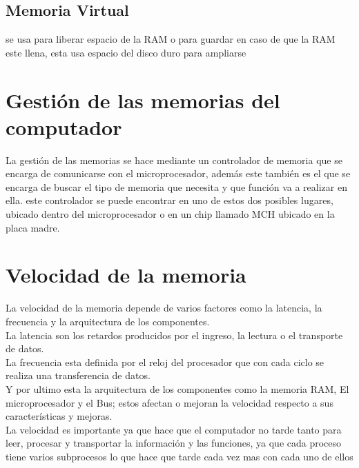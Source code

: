 \documentclass{article}
\begin{document}
	\subsection{Memoria Virtual}
	se usa para liberar espacio de la RAM o para guardar en caso de que la RAM este llena, esta usa espacio del disco duro para ampliarse
	
	\section{Gestión de las memorias del computador}
	La gestión de las memorias se hace mediante un controlador de memoria que se encarga de comunicarse con el microprocesador, además este también es el que se encarga de buscar el tipo de memoria que necesita y que función va a realizar en ella.
	este controlador se puede encontrar en uno de estos dos posibles lugares, ubicado dentro del microprocesador o en un chip llamado MCH ubicado en la placa madre.\cite{memoria}
	
	\section{Velocidad de la memoria}
	La velocidad de la memoria depende de varios factores como la latencia, la frecuencia y la arquitectura de los componentes.\\
	La latencia son los retardos producidos por el ingreso,
	la lectura o el transporte de datos.\\
	La frecuencia esta definida por el reloj del procesador que con cada ciclo se realiza una transferencia de datos.\\
	Y por ultimo esta la arquitectura de los componentes como la memoria RAM,
	El microprocesador y el Bus; estos afectan o mejoran la velocidad respecto a sus características y mejoras.\cite{velocidad}\\
	
	La velocidad es importante ya que hace que el computador no tarde tanto para leer, procesar y transportar la información y las funciones, ya que cada proceso tiene varios subprocesos lo que hace que tarde cada vez mas con cada uno de ellos
	\vfill
	\newpage
	
	
	
	
	
	
\end{document}
